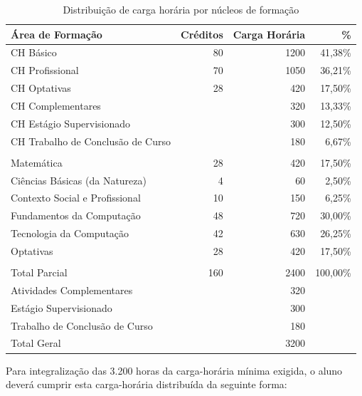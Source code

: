 \documentclass[
	12pt,				%
	openright,			%
  oneside,     %
	a4paper,			%
	english,			%
	french,				%
	spanish,			%
	brazil				%
	]{abntex2}
\begin{document}
\begin{table}[htbp]
  \centering
  \caption{Distribuição de carga horária por núcleos de formação}
    \begin{tabular}{l|r|r|r}
\hline \textbf{Área de Formação} & \textbf{Créditos} & \textbf{Carga Horária} & \textbf{\%} \\ \hline
    CH Básico & 80    & 1200  & 41,38\% \\ \hline
    CH Profissional & 70    & 1050  & 36,21\% \\ \hline
    CH Optativas & 28    & 420   & 17,50\% \\ \hline
    CH Complementares &       & 320   & 13,33\% \\ \hline
    CH Estágio Supervisionado &      & 300   & 12,50\% \\ \hline
    CH Trabalho de Conclusão de Curso &      & 180   & 6,67\% \\ \hline
          &       &       &  \\ \hline
    Matemática & 28    & 420   & 17,50\% \\ \hline
    Ciências Básicas (da Natureza) & 4     & 60    & 2,50\% \\ \hline
    Contexto Social e Profissional & 10    & 150   & 6,25\% \\ \hline
    Fundamentos da Computação & 48    & 720   & 30,00\% \\ \hline
    Tecnologia da Computação & 42    & 630   & 26,25\% \\ \hline
    Optativas & 28    & 420   & 17,50\% \\ \hline
          &       &       &  \\ \hline
    Total Parcial & 160   & 2400  & 100,00\% \\ \hline
    Atividades Complementares &       & 320   &  \\ \hline
    Estágio Supervisionado &       & 300   &  \\ \hline
    Trabalho de Conclusão de Curso &      & 180   &  \\ \hline
    Total Geral &       & 3200  &  \\ \hline


    \end{tabular}%
  \label{tab:CHNucleoFormacao}%
\end{table}%


Para integralização das 3.200 horas da carga-horária mínima exigida, o aluno deverá cumprir esta carga-horária distribuída da seguinte forma: 
\end{document}
